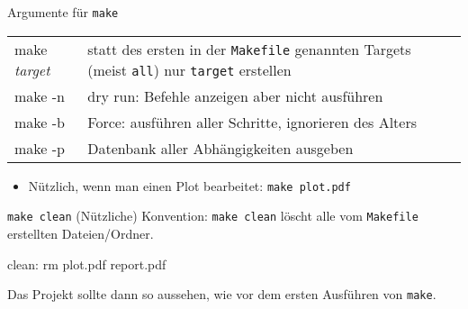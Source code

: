 \begin{frame}[fragile]{Argumente für \texttt{make}}
  \begin{tabu}{>{\ttfamily}l X[,L]}
    make \textit{target} & statt des ersten in der \texttt{Makefile} genannten Targets (meist \texttt{all}) nur \texttt{target} erstellen \\
    make -n              & dry run: Befehle anzeigen aber nicht ausführen \\
    make -b              & Force: ausführen aller Schritte, ignorieren des Alters \\
    make -p              & Datenbank aller Abhängigkeiten ausgeben
  \end{tabu}
  \begin{itemize}
    \item Nützlich, wenn man einen Plot bearbeitet: \texttt{make plot.pdf}
  \end{itemize}
\end{frame}

\begin{frame}[fragile]{\texttt{make clean}}
  (Nützliche) Konvention: \texttt{make clean} löscht alle vom \texttt{Makefile} erstellten Dateien/Ordner.

  \begin{center}
    \begin{lstmake}
      clean:
          rm plot.pdf report.pdf
    \end{lstmake}
  \end{center}

  Das Projekt sollte dann so aussehen, wie vor dem ersten Ausführen von \texttt{make}.
\end{frame}

